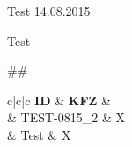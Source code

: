 \documentclass[
a4paper,                                               %
landscape,
oneside,                                               %
12pt,                                                  %
pagesize=auto,                                         %
headsepline,                                           %
]{scrreprt}
\newcommand{\cs}[2]{#2}
\begin{document}
\textbf{}\hfill{\Huge Test} \hfill \cs{\verb|## print DateTime.Now.ToShortDateString(); ##|}{14.08.2015}

\cs{{## print 1; ##}}{Test}

    \begin{bchart}[step=2,max=10]
		##%
				\smallskip
				\medskip
				\bigskip
    \end{bchart}


\begin{center}
\small
\begin{longtable}{\cs{\verb|## print EnumerableExtension.Implode(Enumerable.Repeat("c", columns), "|"); ##|}{c|c|c}}
	\cs{
	\begin{comment}##
	foreach (var h in o.Headers) {
		if (h == "ID" || h == "KFZ") {
			print (first ? "" : @" & ") + @"\textbf{" + Tex.Escape(h) + @"}";
		} else {
			print (first ? "" : @" & ") + @"\rotatebox{90}{\textbf{" + Tex.Escape(h) + @"}}";
		}
		first = false;
	}
	##\end{comment}
	}{\textbf{ID} & \textbf{KFZ} & }\\
	\hline
	\endhead
	\cs{
	\begin{comment}##
	foreach (var e in o.Entries) {
		first = true;
		foreach (var v in e) {
			print (first ? "" : @" & ") + Tex.Escape(v);
			first = false;
		}
		print @"\\\hline
	";
	}
	##\end{comment}
	}{2 & TEST-0815\_2 & X\\\hline
	3 & Test & X\\\hline}
\end{longtable}
\end{center}
\end{document}
